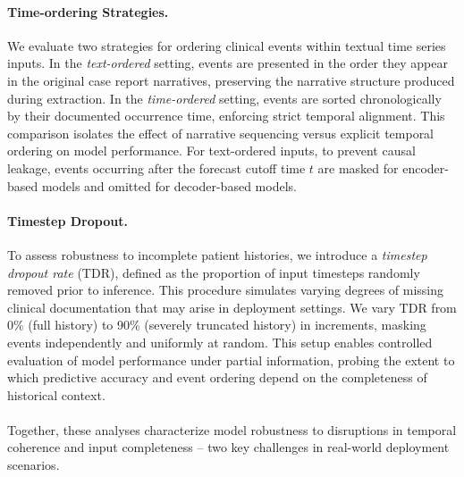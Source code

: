 \paragraph{Time-ordering Strategies.} We evaluate two strategies for ordering clinical events within textual time series inputs. In the \emph{text-ordered} setting, events are presented in the order they appear in the original case report narratives, preserving the narrative structure produced during extraction. In the \emph{time-ordered} setting, events are sorted chronologically by their documented occurrence time, enforcing strict temporal alignment. This comparison isolates the effect of narrative sequencing versus explicit temporal ordering on model performance. For text-ordered inputs, to prevent causal leakage, events occurring after the forecast cutoff time $t$ are masked for encoder-based models and omitted for decoder-based models.

\paragraph{Timestep Dropout.} To assess robustness to incomplete patient histories, we introduce a \emph{timestep dropout rate} (TDR), defined as the proportion of input timesteps randomly removed prior to inference. This procedure simulates varying degrees of missing clinical documentation that may arise in deployment settings. We vary TDR from 0\% (full history) to 90\% (severely truncated history) in increments, masking events independently and uniformly at random. This setup enables controlled evaluation of model performance under partial information, probing the extent to which predictive accuracy and event ordering depend on the completeness of historical context.

\paragraph{} Together, these analyses characterize model robustness to disruptions in temporal coherence and input completeness -- two key challenges in real-world deployment scenarios.